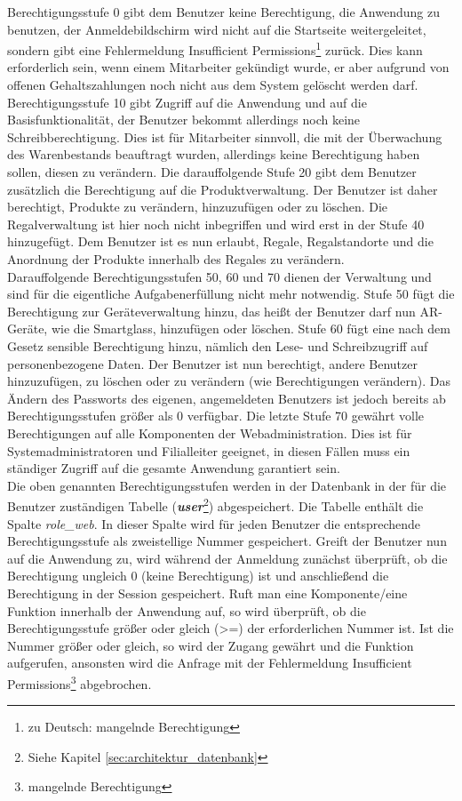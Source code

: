 Berechtigungsstufe 0 gibt dem Benutzer keine Berechtigung, die Anwendung zu benutzen, der Anmeldebildschirm wird nicht auf die Startseite weitergeleitet, sondern gibt eine Fehlermeldung \glqq Insufficient Permissions\grqq\footnote{zu Deutsch: \glqq mangelnde Berechtigung\grqq} zurück. Dies kann erforderlich sein, wenn einem Mitarbeiter gekündigt wurde, er aber aufgrund von \zB offenen Gehaltszahlungen noch nicht aus dem System gelöscht werden darf. Berechtigungsstufe 10 gibt Zugriff auf die Anwendung und auf die Basisfunktionalität, der Benutzer bekommt allerdings noch keine Schreibberechtigung. Dies ist für Mitarbeiter sinnvoll, die mit der Überwachung des Warenbestands beauftragt wurden, allerdings keine Berechtigung haben sollen, diesen zu verändern. Die darauffolgende Stufe 20 gibt dem Benutzer zusätzlich die Berechtigung auf die Produktverwaltung. Der Benutzer ist daher berechtigt, Produkte zu verändern, hinzuzufügen oder zu löschen. Die Regalverwaltung ist hier noch nicht inbegriffen und wird erst in der Stufe 40 hinzugefügt. Dem Benutzer ist es nun erlaubt, Regale, Regalstandorte und die Anordnung der Produkte innerhalb des Regales zu verändern.\\
Darauffolgende Berechtigungsstufen 50, 60 und 70 dienen der Verwaltung und sind für die eigentliche Aufgabenerfüllung nicht mehr notwendig. Stufe 50 fügt die Berechtigung zur Geräteverwaltung hinzu, das heißt der Benutzer darf nun \ac{AR}-Geräte, wie \zB die Smartglass, hinzufügen oder löschen. Stufe 60 fügt eine nach dem Gesetz sensible Berechtigung hinzu, nämlich den Lese- und Schreibzugriff auf personenbezogene Daten. Der Benutzer ist nun berechtigt, andere Benutzer hinzuzufügen, zu löschen oder zu verändern (wie \zB Berechtigungen verändern). Das Ändern des Passworts des eigenen, angemeldeten Benutzers ist jedoch bereits ab Berechtigungsstufen größer als 0 verfügbar. Die letzte Stufe 70 gewährt volle Berechtigungen auf alle Komponenten der Webadministration. Dies ist für Systemadministratoren und Filialleiter geeignet, in diesen Fällen muss ein ständiger Zugriff auf die gesamte Anwendung garantiert sein.\\

Die oben genannten Berechtigungsstufen werden in der Datenbank in der für die Benutzer zuständigen Tabelle (\textbf{\textit{user}}\footnote{Siehe Kapitel \ref{sec:architektur_datenbank} }) abgespeichert. Die Tabelle enthält die Spalte \emph{role\_web}. In dieser Spalte wird für jeden Benutzer die entsprechende Berechtigungsstufe als zweistellige Nummer gespeichert. Greift der Benutzer nun auf die Anwendung zu, wird während der Anmeldung zunächst überprüft, ob die Berechtigung ungleich 0 (keine Berechtigung) ist und anschließend die Berechtigung in der Session gespeichert. Ruft man eine Komponente/eine Funktion innerhalb der Anwendung auf, so wird überprüft, ob die Berechtigungsstufe größer oder gleich (>=) der erforderlichen Nummer ist. Ist die Nummer größer oder gleich, so wird der Zugang gewährt und die Funktion aufgerufen, ansonsten wird die Anfrage mit der Fehlermeldung \glqq Insufficient Permissions\grqq\footnote{\glqq mangelnde Berechtigung\grqq} abgebrochen.

